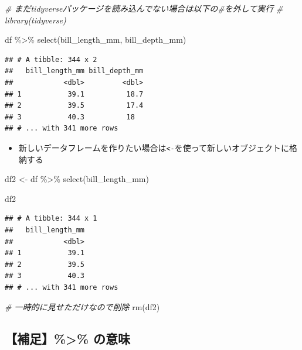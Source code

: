 \documentclass[
  xelatex,ja=standard, b5paper]{bxjsbook}
\newenvironment{Shaded}{\begin{snugshade}}{\end{snugshade}}
\newcommand{\CommentTok}[1]{\textcolor[rgb]{0.56,0.35,0.01}{\textit{#1}}}
\newcommand{\FunctionTok}[1]{\textcolor[rgb]{0.00,0.00,0.00}{#1}}
\newcommand{\NormalTok}[1]{#1}
\newcommand{\OtherTok}[1]{\textcolor[rgb]{0.56,0.35,0.01}{#1}}
\newcommand{\SpecialCharTok}[1]{\textcolor[rgb]{0.00,0.00,0.00}{#1}}
\providecommand{\tightlist}{%
  \setlength{\itemsep}{0pt}\setlength{\parskip}{0pt}}
\begin{document}
\begin{Shaded}
\begin{Highlighting}[]
\CommentTok{\# まだtidyverseパッケージを読み込んでない場合は以下の\#を外して実行}
\CommentTok{\# library(tidyverse)}

\NormalTok{df }\SpecialCharTok{\%\textgreater{}\%} 
  \FunctionTok{select}\NormalTok{(bill\_length\_mm, bill\_depth\_mm)}
\end{Highlighting}
\end{Shaded}

\begin{verbatim}
## # A tibble: 344 x 2
##   bill_length_mm bill_depth_mm
##            <dbl>         <dbl>
## 1           39.1          18.7
## 2           39.5          17.4
## 3           40.3          18  
## # ... with 341 more rows
\end{verbatim}

\begin{itemize}
\tightlist
\item
  新しいデータフレームを作りたい場合は\texttt{\textless{}-}を使って新しいオブジェクトに格納する
\end{itemize}

\begin{Shaded}
\begin{Highlighting}[]
\NormalTok{df2 }\OtherTok{\textless{}{-}} 
\NormalTok{  df }\SpecialCharTok{\%\textgreater{}\%} \FunctionTok{select}\NormalTok{(bill\_length\_mm)}

\NormalTok{df2}
\end{Highlighting}
\end{Shaded}

\begin{verbatim}
## # A tibble: 344 x 1
##   bill_length_mm
##            <dbl>
## 1           39.1
## 2           39.5
## 3           40.3
## # ... with 341 more rows
\end{verbatim}

\begin{Shaded}
\begin{Highlighting}[]
\CommentTok{\# 一時的に見せただけなので削除}
\FunctionTok{rm}\NormalTok{(df2)}
\end{Highlighting}
\end{Shaded}

\hypertarget{select-standard-pipe}{%
\subsection{【補足】\%\textgreater\% の意味}\label{select-standard-pipe}}
\end{document}
